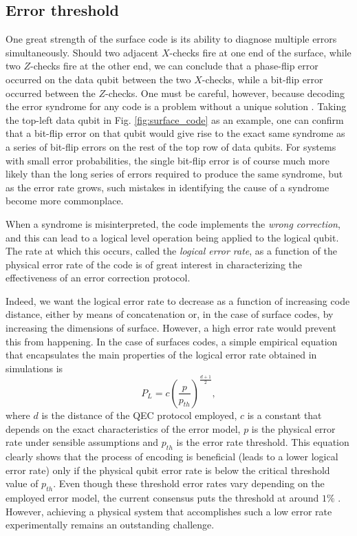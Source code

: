 \subsection{Error threshold}
One great strength of the surface code is its ability to diagnose multiple
errors simultaneously. Should two adjacent $X$-checks fire at one end of the
surface, while two $Z$-checks fire at the other end, we can conclude that a
phase-flip error occurred on the data qubit between the two $X$-checks, while a
bit-flip error occurred between the $Z$-checks. One must be careful, however,
because decoding the error syndrome for any code is a problem without a unique
solution \cite{terhal15}. Taking the top-left data qubit in Fig.
\ref{fig:surface_code} as an example, one can confirm that a bit-flip error on
that qubit would give rise to the exact same syndrome as a series of bit-flip
errors on the rest of the top row of data qubits. For systems with small error
probabilities, the single bit-flip error is of course much more likely than the
long series of errors required to produce the same syndrome, but as the error
rate grows, such mistakes in identifying the cause of a syndrome become more
commonplace.

When a syndrome is misinterpreted, the code implements the \textit{wrong
  correction}, and this can lead to a logical level operation being applied to
the logical qubit. The rate at which this occurs, called the \textit{logical
  error rate}, as a function of the physical error rate of the code is of great
interest in characterizing the effectiveness of an error correction protocol.

Indeed, we want the logical error rate to decrease as a function of increasing
code distance, either by means of concatenation or, in the case of surface
codes, by increasing the dimensions of surface. However, a high error rate would
prevent this from happening. In the case of surfaces codes, a simple empirical
equation that encapsulates the main properties of the logical error rate
obtained in simulations is \cite{fowler12_surfac_codes}
\begin{equation}
  \label{eq:1}
  P_L = c\left(\frac{p}{p_{th}}\right)^{\frac{ d+1 }{2}},
\end{equation}
where $d$ is the distance of the QEC protocol employed, $c$ is a constant that
depends on the exact characteristics of the error model, $p$ is the physical
error rate under sensible assumptions and $p_{th}$ is the error rate threshold.
This equation clearly shows that the process of encoding is beneficial (leads to
a lower logical error rate) only if the physical qubit error rate is below the
critical threshold value of $p_{th}$. Even though these threshold error rates
vary depending on the employed error model, the current consensus puts the
threshold at around $1\%$ \cite{terhal15} \cite{Versluis_2017}. However,
achieving a physical system that accomplishes such a low error rate
experimentally remains an outstanding challenge.

